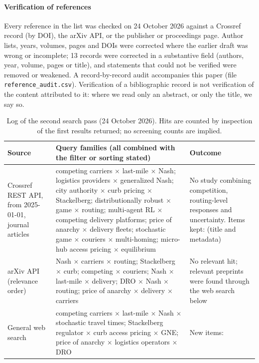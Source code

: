 \documentclass[preprint,12pt]{elsarticle}
\begin{document}
\paragraph{Verification of references} Every reference in the list was checked on 24 October 2026 against a Crossref record (by DOI), the arXiv API, or the publisher or proceedings page. Author lists, years, volumes, pages and DOIs were corrected where the earlier draft was wrong or incomplete; 13 records were corrected in a substantive field (authors, year, volume, pages or title), and statements that could not be verified were removed or weakened. A record-by-record audit accompanies this paper (file \texttt{reference\_audit.csv}). Verification of a bibliographic record is not verification of the content attributed to it: where we read only an abstract, or only the title, we say so.

\begin{table}[t]
\centering
\caption{Log of the second search pass (24 October 2026). Hits are counted by inspection of the first results returned; no screening counts are implied.}\label{tab:searchlog}
\small
\begin{tabularx}{\textwidth}{@{}L{2.6cm}X L{3.6cm}@{}}
\toprule
Source & Query families (all combined with the filter or sorting stated) & Outcome\\
\midrule
Crossref REST API, from 2025-01-01, journal articles & competing carriers $\times$ last-mile $\times$ Nash; logistics providers $\times$ generalized Nash; city authority $\times$ curb pricing $\times$ Stackelberg; distributionally robust $\times$ game $\times$ routing; multi-agent RL $\times$ competing delivery platforms; price of anarchy $\times$ delivery fleets; stochastic game $\times$ couriers $\times$ multi-homing; micro-hub access pricing $\times$ equilibrium & No study combining competition, routing-level responses and uncertainty. Items kept: \cite{Zhou2026trb,LiuMaMa2026,Salarpour2026,Zhou2026,Gao2025tre} (title and metadata)\\
arXiv API (relevance order) & Nash $\times$ carriers $\times$ routing; Stackelberg $\times$ curb; competing $\times$ couriers; Nash $\times$ last-mile $\times$ delivery; DRO $\times$ Nash $\times$ routing; price of anarchy $\times$ delivery $\times$ carriers & No relevant hit; relevant preprints \cite{Masiha2026,Kaewpuang2023} were found through the web search below\\
General web search & competing carriers $\times$ last-mile $\times$ Nash $\times$ stochastic travel times; Stackelberg regulator $\times$ curb access pricing $\times$ GNE; price of anarchy $\times$ logistics operators $\times$ DRO & New items: \cite{Martin2021,Kaewpuang2023,Masiha2026,Correa2019}\\
\bottomrule
\end{tabularx}
\end{table}
\end{document}
